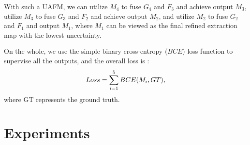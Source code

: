 \documentclass[lettersize,journal]{IEEEtran}
\begin{document}
With such a UAFM, we can utilize $M_4$ to fuse $G_{4}$ and $F_{3}$ and achieve output $M_3$, utilize $M_3$ to fuse $G_{3}$ and $F_{2}$ and achieve output $M_2$, and utilize $M_2$ to fuse $G_{2}$ and $F_{1}$ and output $M_1$, where $M_1$ can be viewed as the final refined extraction map with the lowest uncertainty.

\par
On the whole, we use the simple binary cross-entropy ($BCE$) loss function to supervise all the outputs, and the overall loss is :
\begin{equation}
\centering
Loss = \sum_{i=1}^{5} BCE(M_i, GT),
\end{equation}
where GT represents the ground truth.

\section{Experiments}
\end{document}
